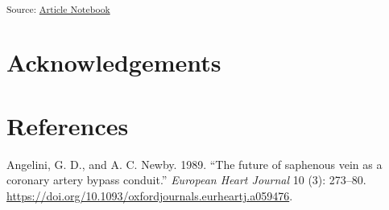 \documentclass[
  letterpaper,
  DIV=11,
  numbers=noendperiod]{scrartcl}
\newlength{\cslhangindent}
\newenvironment{CSLReferences}[2] %
 {\begin{list}{}{%
  \setlength{\itemindent}{0pt}
  \setlength{\leftmargin}{0pt}
  \setlength{\parsep}{0pt}
  \ifodd #1
   \setlength{\leftmargin}{\cslhangindent}
   \setlength{\itemindent}{-1\cslhangindent}
  \fi
  \setlength{\itemsep}{#2\baselineskip}}}
 {\end{list}}
\begin{document}
\begin{table}
{}

\end{table}%

\textsubscript{Source:
\href{https://raffdoc.github.io/manuscript-template/index-preview.html}{Article
Notebook}}

\section{Acknowledgements}\label{acknowledgements}

\section*{References}\label{references}

\label{refs}
\begin{CSLReferences}{1}{0}
Angelini, G. D., and A. C. Newby. 1989. {``The future of saphenous vein
as a coronary artery bypass conduit.''} \emph{European Heart Journal} 10
(3): 273--80.
\url{https://doi.org/10.1093/oxfordjournals.eurheartj.a059476}.

\end{CSLReferences}
\end{document}
